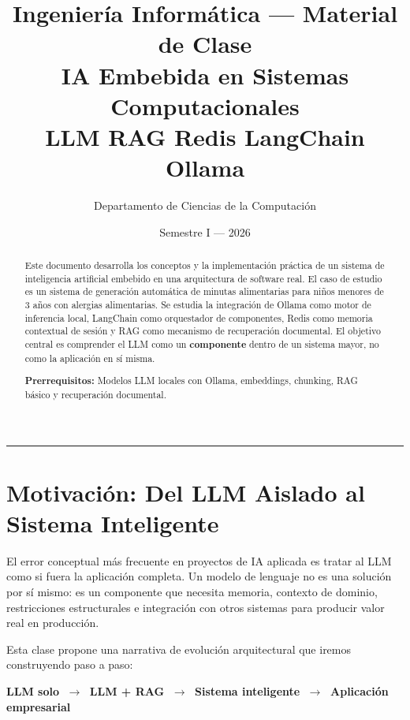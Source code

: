 \documentclass[12pt,a4paper]{article}
\title{
  \vspace{-1cm}
  {\large Ingeniería Informática --- Material de Clase}\\[0.5em]
  {\LARGE\bfseries\color{azulprimario}
    IA Embebida en Sistemas Computacionales}\\[0.4em]
  {\large LLM \textbullet{} RAG \textbullet{} Redis \textbullet{}
   LangChain \textbullet{} Ollama}
}
\author{Departamento de Ciencias de la Computación}
\date{Semestre I --- 2026}
\begin{document}
\maketitle
\thispagestyle{fancy}

\begin{abstract}
Este documento desarrolla los conceptos y la implementación práctica de un sistema
de inteligencia artificial embebido en una arquitectura de software real. El caso
de estudio es un sistema de generación automática de minutas alimentarias para
niños menores de 3 años con alergias alimentarias. Se estudia la integración de
Ollama como motor de inferencia local, LangChain como orquestador de componentes,
Redis como memoria contextual de sesión y RAG como mecanismo de recuperación
documental. El objetivo central es comprender el LLM como un \textbf{componente}
dentro de un sistema mayor, no como la aplicación en sí misma.

\medskip
\noindent
\textbf{Prerrequisitos:} Modelos LLM locales con Ollama, embeddings, chunking,
RAG básico y recuperación documental.
\end{abstract}

\tableofcontents
\vspace{1em}
\rule{\linewidth}{0.5pt}

\section{Motivación: Del LLM Aislado al Sistema Inteligente}

El error conceptual más frecuente en proyectos de IA aplicada es tratar al
LLM como si fuera la aplicación completa. Un modelo de lenguaje no es una
solución por sí mismo: es un componente que necesita memoria, contexto de
dominio, restricciones estructurales e integración con otros sistemas para
producir valor real en producción.

Esta clase propone una narrativa de evolución arquitectural que iremos
construyendo paso a paso:

\begin{center}
\large
\textbf{LLM solo}
$\;\longrightarrow\;$
\textbf{LLM + RAG}
$\;\longrightarrow\;$
\textbf{Sistema inteligente}
$\;\longrightarrow\;$
\textbf{Aplicación empresarial}
\end{center}
\end{document}
